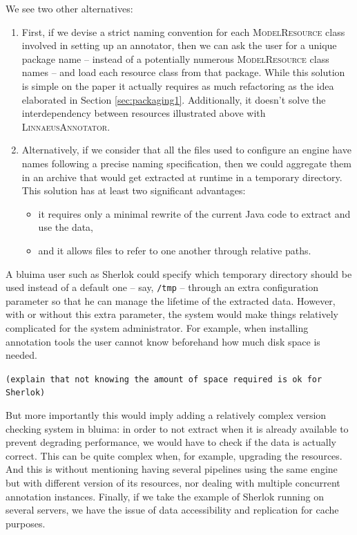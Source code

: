 \documentclass{article}
\newcommand{\ID}[1]{{\textsc{#1}}}
\newcommand{\PATH}[1]{\mbox{\texttt{#1}}}
\newcommand{\TODO}[1]{\texttt{\textcolor{YellowOrange}{(#1)}}} %
\begin{document}
We see two other alternatives:

\begin{enumerate}

\item First, if we devise a strict naming convention for each \ID{ModelResource} class involved in setting up an annotator, then we can ask the user for a unique package name -- instead of a potentially numerous \ID{ModelResource} class names -- and load each resource class from that package. While this solution is simple on the paper it actually requires as much refactoring as the idea elaborated in Section \ref{sec:packaging1}. Additionally, it doesn't solve the interdependency between resources illustrated above with \ID{LinnaeusAnnotator}.

\item Alternatively, if we consider that all the files used to configure an engine have names following a precise naming specification, then we could aggregate them in an archive that would get extracted at runtime in a temporary directory. This solution has at least two significant advantages:

\begin{itemize}

\item it requires only a minimal rewrite of the current Java code to extract and use the data,

\item and it allows files to refer to one another through relative paths.

\end{itemize}

\end{enumerate}

A bluima user such as Sherlok could specify which temporary directory should be used instead of a default one -- say, \PATH{/tmp} -- through an extra configuration parameter so that he can manage the lifetime of the extracted data. However, with or without this extra parameter, the system would make things relatively complicated for the system administrator. For example, when installing annotation tools the user cannot know beforehand how much disk space is needed.

\TODO{explain that not knowing the amount of space required is ok for Sherlok}

But more importantly this would imply adding a relatively complex version checking system in bluima: in order to not extract when it is already available to prevent degrading performance, we would have to check if the data is actually correct. This can be quite complex when, for example, upgrading the resources. And this is without mentioning having several pipelines using the same engine but with different version of its resources, nor dealing with multiple concurrent annotation instances. Finally, if we take the example of Sherlok running on several servers, we have the issue of data accessibility and replication for cache purposes.
\end{document}
